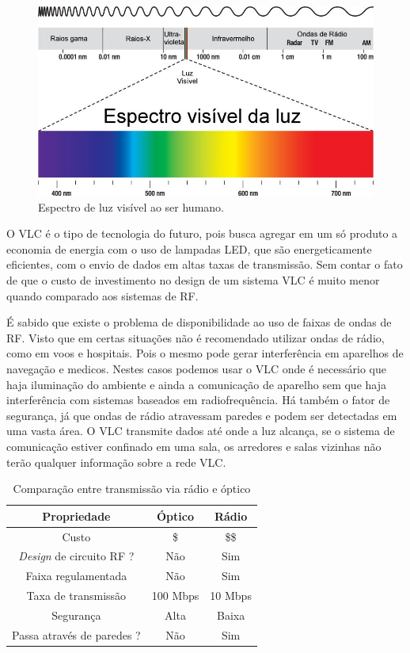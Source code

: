 \begin{figure}
	\centering
		\includegraphics[width = 12cm]{figuras/espectro-visivel-da-luz}
	\caption{Espectro de luz visível ao ser humano.}
	\label{Fig: espectro-visivel-da-luz}
\end{figure}


O VLC é o tipo de tecnologia do futuro, pois busca agregar em um só produto a economia de energia com o uso de lampadas LED, que são energeticamente eficientes, com o envio de dados em altas taxas de transmissão. Sem contar o fato de que o custo de investimento no design de um sistema VLC é muito menor quando comparado aos sistemas de RF.

É sabido que existe o problema de disponibilidade ao uso de faixas de ondas de RF. Visto que em certas situações não é recomendado utilizar ondas de rádio, como em voos e hospitais. Pois o mesmo pode gerar interferência em aparelhos de navegação e medicos. Nestes casos podemos usar o VLC onde é necessário que haja iluminação do ambiente e ainda a comunicação de aparelho sem que haja interferência com sistemas baseados em radiofrequência. Há também o fator de segurança, já que ondas de rádio atravessam paredes e podem ser detectadas em uma vasta área. O VLC transmite dados até onde a luz alcança, se o sistema de comunicação estiver confinado em uma sala, os arredores e salas vizinhas não terão qualquer informação sobre a rede VLC.

\begin{table}[h]
	\centering
	\begin{tabular}{ccc}
		\toprule
		\textbf{Propriedade} & \textbf{Óptico} &
		\textbf{Rádio}\\
		\midrule
		Custo & \$ & \$\$\\
		\textit{Design} de circuito RF ? & Não & Sim\\
		Faixa regulamentada & Não & Sim\\
		Taxa de transmissão & 100 Mbps & 10 Mbps\\
		Segurança & Alta & Baixa\\
		Passa através de paredes ? & Não & Sim\\
		\bottomrule
	\end{tabular}
	
	\caption{Comparação entre transmissão via rádio e óptico \cite{Hranilovic}}
	\label{Tab: Rádio vs VLC}
\end{table}

